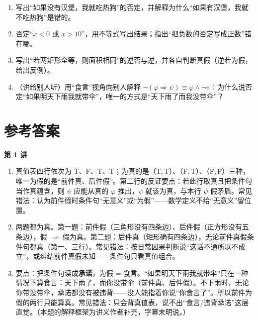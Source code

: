 \documentclass[UTF8,a4paper,11pt]{ctexart}
\begin{document}
\begin{exercise}[今日自测]
\begin{enumerate}
  \item 写出“如果没有汉堡，我就吃热狗”的否定，并解释为什么“如果有汉堡，我就不吃热狗”是错的。
  \item 否定“$x < 0$ 或 $x > 10$”，用不等式写出结果；指出“把负数的否定写成正数”错在哪。
  \item 写出“若两矩形全等，则面积相同”的逆否与逆，并各自判断真假（逆若为假，给出反例）。
  \item （讲给别人听）用“食言”视角向别人解释 $\neg(\varphi \Rightarrow \psi) \equiv \varphi \land \neg\psi$：为什么说否定“如果明天下雨我就带伞”，唯一的方式是“天下雨了而我没带伞”？
\end{enumerate}
\end{exercise}

\newpage

\section*{参考答案}

\textbf{第 1 讲}
\begin{enumerate}
  \item 真值表四行依次为 T、F、T、T；为真的是（T,\,T）、（F,\,T）、（F,\,F）三种，唯一为假的是“前件真、后件假”。第二行的反证要点：若此行取真且把条件句当作真蕴含，则 $\psi$ 应能从真的 $\varphi$ 推出，$\psi$ 就该为真，与本行 $\psi$ 假矛盾。常见错法：认为前件假时条件句“无意义”或“为假”——数学定义不给“无意义”留位置。
  \item 两题都为真。第一题：前件假（三角形没有四条边）、后件假（正方形没有五条边），假 $\Rightarrow$ 假为真。第二题：后件真（矩形确有四条边），无论前件真假条件句都真（第一、三行）。常见错法：按日常因果判断说“这话不通所以不成立”，或纠结前件真假未知——条件句只看真值组合。
  \item 要点：把条件句读成\textbf{承诺}，为假 = 食言。“如果明天下雨我就带伞”只在一种情况下算食言：天下雨了，而你没带伞（前件真、后件假）。不下雨时，无论你带没带伞，承诺都没有被违背——没人能指着你说“你食言了”。所以前件为假的两行只能算真。常见错法：只会背真值表，说不出“食言/违背承诺”这层直觉。（本题的解释框架为讲义作者补充，字幕未明说。）
\end{enumerate}
\end{document}
